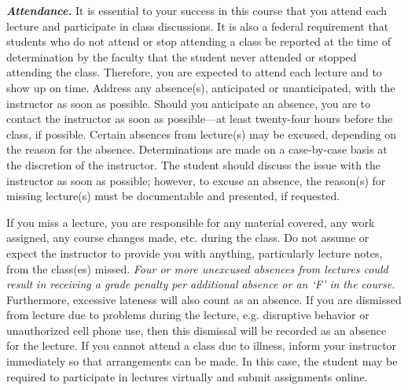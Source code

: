 \documentclass[11pt,letterpaper]{article}
\begin{document}
{\itshape\bfseries\color{stacred}Attendance.} It is essential to your success in this course that you attend each lecture and participate in class discussions. It is also a federal requirement that students who do not attend or stop attending a class be reported at the time of determination by the faculty that the student never attended or stopped attending the class. Therefore, you are expected to attend each lecture and to show up on time. Address any absence(s), anticipated or unanticipated, with the instructor as soon as possible. Should you anticipate an absence, you are to contact the instructor as soon as possible---at least twenty-four hours before the class, if possible.  Certain absences from lecture(s) may be excused, depending on the reason for the absence. Determinations are made on a case-by-case basis at the discretion of the instructor. The student should discuss the issue with the instructor as soon as possible; however, to excuse an absence, the reason(s) for missing lecture(s) must be documentable and presented, if requested. \pspace

If you miss a lecture, you are responsible for any material covered, any work assigned, any course changes made, etc. during the class. Do not assume or expect the instructor to provide you with anything, particularly lecture notes, from the class(es) missed. {\itshape Four or more unexcused absences from lectures could result in receiving a grade penalty per additional absence or an `F' in the course.} Furthermore, excessive lateness will also count as an absence. If you are dismissed from lecture due to problems during the lecture, e.g. disruptive behavior or unauthorized cell phone use, then this dismissal will be recorded as an absence for the lecture. If you cannot attend a class due to illness, inform your instructor immediately so that arrangements can be made. In this case, the student may be required to participate in lectures virtually and submit assignments online. \pspace
\end{document}

